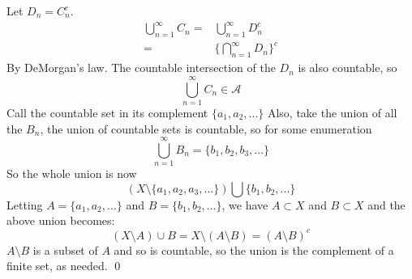 \documentclass[11pt,oneside]{article}
\numberwithin{equation}{section}
\theoremstyle{definition}
\newtheorem{exercise}{Exercise}
\def\calA{\mathcal{A}}
\begin{document}
\begin{solution}
\begin{enumerate}[(i)]
      Let $D_n = C_n ^c$.  
      \begin{align*}
      \bigcup _ {n=1}^\infty C_n = & \bigcup _ {n=1}^\infty D_n^c \\ 
      = &  \{ \bigcap _{n=1}^\infty D_n \} ^ c
      \end{align*}
      By DeMorgan's law.  The countable intersection of the $D_n$ is
      also countable, so
      $$
      \bigcup _ {n=1}^\infty C_n \in \calA
      $$
      Call the countable set in its complement $ \{ a_1, a_2, ... \}$
      Also, take the union of all the $B_n$, the union of countable sets
      is countable, so for some enumeration
      $$
      \bigcup _{n=1}^\infty B_n = \{ b_1, b_2, b_3, ... \}
      $$
      So the whole union is now
      $$
      ( X \setminus \{a_1, a_2, a_3, ... \}) \bigcup \{b_1, b_2, ... \}
      $$
      Letting $ A = \{ a_1, a_2, ... \}$ and 
      $ B = \{ b_1, b_2, ... \} $, we have $A \subset X $ and $B \subset X$ and the
      above union becomes:
      $$
      (X \setminus A ) \cup B = X \setminus ( A \setminus B) = (A \setminus B) ^c
      $$
      $A \setminus B$ is a subset of $A$ and so is countable, so the union is the complement of a
      finite set, as needed.  \qed

      
      
  \end{enumerate}

\end{solution}

\begin{comment}
\begin{exercise}
  problem
\end{exercise}
\begin{solution}
\begin{enumerate}[(a)]
\item
  first answer
\end{enumerate}
\end{solution}
\end{comment}
\end{document}

